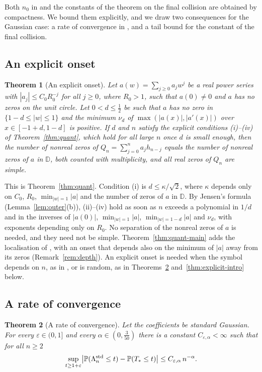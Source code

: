 \documentclass[11pt]{amsart}
\newtheorem{theorem}{Theorem}[section]
\theoremstyle{definition}
\theoremstyle{remark}
\numberwithin{equation}{section}
\newcommand{\D}{\mathbb{D}}
\newcommand{\PP}{\mathbb{P}}
\newcommand{\eps}{\varepsilon}
\begin{document}
Both $n_0$ in \cite[Theorem~\ref{M-thm:main}]{Main} and the constants of the theorem on the final collision \cite[Theorem~\ref{M-thm:collision}]{Main} are obtained by compactness. We bound them explicitly, and we draw two consequences for the Gaussian case: a rate of convergence in \cite[Theorem~\ref{M-cor:weyl}]{Main}, and a tail bound for the constant of the final collision.

\subsection{An explicit onset}
\begin{theorem}[An explicit onset]\label{thm:quant-intro}
Let $a(w)=\sum_{j\ge0}a_jw^j$ be a real power series with $|a_j|\le C_0R_0^{-j}$ for all $j\ge0$, where $R_0>1$, such that $a(0)\ne0$ and $a$ has no zeros on the unit circle. Let $0<d\le\frac12$ be such that $a$ has no zero in $\{1-d\le|w|\le1\}$ and the minimum $\nu_d$ of $\max(|a(x)|,|a'(x)|)$ over $x\in[-1+d,1-d]$ is positive. If $d$ and $n$ satisfy the explicit conditions (i)--(iv) of Theorem~\ref{thm:quant}, which hold for all large $n$ once $d$ is small enough, then the number of nonreal zeros of $Q_n=\sum_{j=0}^{n}a_jh_{n-j}$ equals the number of nonreal zeros of $a$ in $\D$, both counted with multiplicity, and all real zeros of $Q_n$ are simple.
\end{theorem}

This is Theorem~\ref{thm:quant}. Condition (i) is $d\le\kappa/\sqrt2$, where $\kappa$ depends only on $C_0$, $R_0$, $\min_{|w|=1}|a|$ and the number of zeros of $a$ in $\D$. By Jensen's formula (Lemma~\ref{lem:outer}(b)), (ii)--(iv) hold as soon as $n$ exceeds a polynomial in $1/d$ and in the inverses of $|a(0)|$, $\min_{|w|=1}|a|$, $\min_{|w|=1-d}|a|$ and $\nu_d$, with exponents depending only on $R_0$. No separation of the nonreal zeros of $a$ is needed, and they need not be simple. Theorem~\ref{thm:quant-main} adds the localisation of \cite[Theorem~\ref{M-thm:main}]{Main}, with an onset that depends also on the minimum of $|a|$ away from its zeros (Remark~\ref{rem:depth}). An explicit onset is needed when the symbol depends on $n$, as in \cite{CompC}, or is random, as in Theorems~\ref{thm:rate-intro} and~\ref{thm:explicit-intro} below.

\subsection{A rate of convergence}
\begin{theorem}[A rate of convergence]\label{thm:rate-intro}
Let the coefficients be standard Gaussian. For every $\eps\in(0,1]$ and every $\alpha\in(0,\frac3{50})$ there is a constant $C_{\eps,\alpha}<\infty$ such that for all $n\ge2$
\[
\sup_{t\ge1+\eps}\bigl|\PP(\Lambda_n^{\rm std}\le t)-\PP(T_*\le t)\bigr|\le C_{\eps,\alpha}\,n^{-\alpha}.
\]
\end{theorem}
\end{document}
